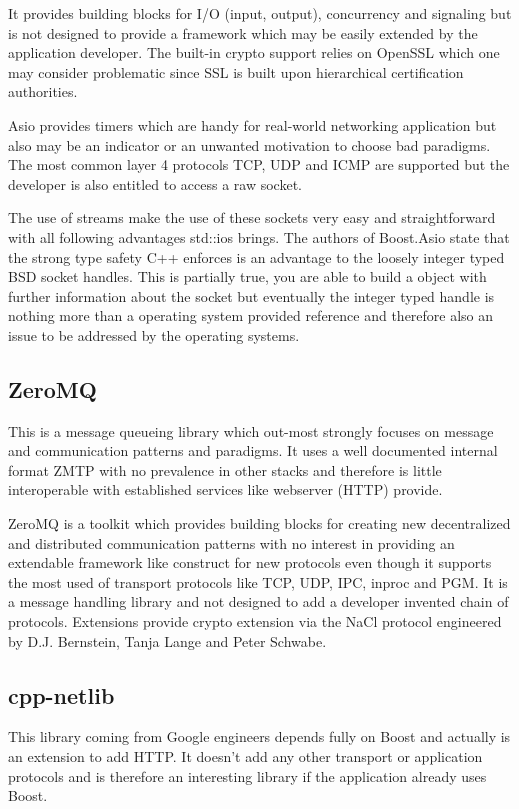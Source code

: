\documentclass[twocolumn,english]{IEEEtran}
\theoremstyle{plain}
\theoremstyle{plain}
\begin{document}
It provides building blocks for I/O (input, output), concurrency and signaling
but is not designed to provide a framework which may be easily extended by the
application developer. The built-in crypto support relies on OpenSSL which one
may consider problematic since SSL is built upon hierarchical certification
authorities.

Asio provides timers which are handy for real-world networking application but
also may be an indicator or an unwanted motivation to choose bad paradigms.
The most common layer 4 protocols TCP, UDP and ICMP are supported but the
developer is also entitled to access a raw socket.

The use of streams make the use of these sockets very easy and straightforward
with all following advantages std::ios brings. The authors of Boost.Asio state
that the strong type safety C++ enforces is an advantage to the loosely
integer typed BSD socket handles. This is partially true, you are able to
build a object with further information about the socket but eventually the
integer typed handle is nothing more than a operating system provided
reference and therefore also an issue to be addressed by the operating
systems.

\subsection{ZeroMQ\cite{zeromq}}
This is a message queueing library which out-most strongly focuses on message
and communication patterns and paradigms. It uses a well documented internal
format ZMTP with no prevalence in other stacks and therefore is little
interoperable with established services like webserver (HTTP) provide.

ZeroMQ is a toolkit which provides building blocks for creating new
decentralized and distributed communication patterns with no interest in
providing an extendable framework like construct for new protocols even though
it supports the most used of transport protocols like TCP, UDP, IPC, inproc
and PGM. It is a message handling library and not designed to add a developer
invented chain of protocols. Extensions provide crypto extension via the NaCl
protocol engineered by D.J. Bernstein, Tanja Lange and Peter Schwabe.

\subsection{cpp-netlib\cite{cpp-netlib}}
This library coming from Google engineers depends fully on Boost and actually
is an extension to add HTTP. It doesn't add any other transport or application
protocols and is therefore an interesting library if the application already
uses Boost.
\end{document}
